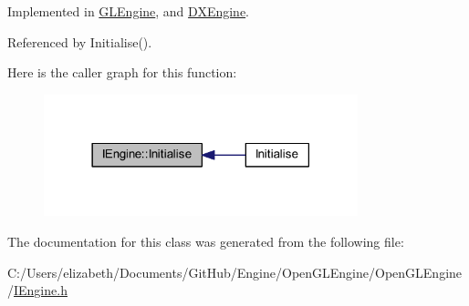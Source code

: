 Implemented in \hyperlink{class_g_l_engine_a8e0944601bd7a7f367ede6b37e9cf9a3}{G\+L\+Engine}, and \hyperlink{class_d_x_engine_a8b5413a8d83f7a1a88b0dcb1e9ab378c}{D\+X\+Engine}.



Referenced by Initialise().



Here is the caller graph for this function\+:\nopagebreak
\begin{figure}[H]
\begin{center}
\leavevmode
\includegraphics[width=258pt]{class_i_engine_a2033b147f3b325d0194b746048a6200e_icgraph}
\end{center}
\end{figure}




The documentation for this class was generated from the following file\+:\begin{DoxyCompactItemize}
\item 
C\+:/\+Users/elizabeth/\+Documents/\+Git\+Hub/\+Engine/\+Open\+G\+L\+Engine/\+Open\+G\+L\+Engine/\hyperlink{_i_engine_8h}{I\+Engine.\+h}\end{DoxyCompactItemize}
